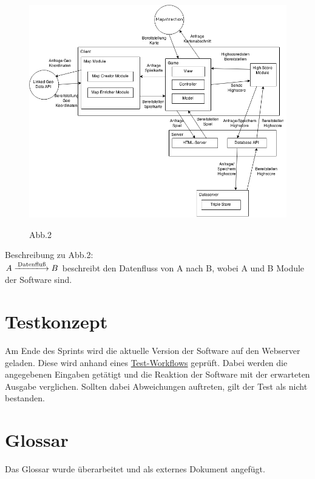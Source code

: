 \documentclass[11pt,a4paper]{article}
\begin{document}
\begin{figure}[htb]
  \centering
  \includegraphics[scale=0.5]{Architecture.png}
  \label{PNFs}
  \caption{Abb.2}
\end{figure} 

Beschreibung zu Abb.2: \\
$A \xlongrightarrow{\text{Datenfluß}} B $ beschreibt den Datenfluss von A nach B, wobei A und B Module der Software sind.


\section{Testkonzept}
Am Ende des Sprints wird die aktuelle Version der Software auf den Webserver geladen. Diese wird anhand eines \href{https://github.com/GKP15/pucman/wiki/Test-workflow}{Test-Workflows} geprüft. Dabei werden die angegebenen Eingaben getätigt und die Reaktion der Software mit der erwarteten Ausgabe verglichen. Sollten dabei Abweichungen auftreten, gilt der Test als nicht bestanden.

\section{Glossar}
Das Glossar wurde überarbeitet und als externes Dokument angefügt.
\end{document}

